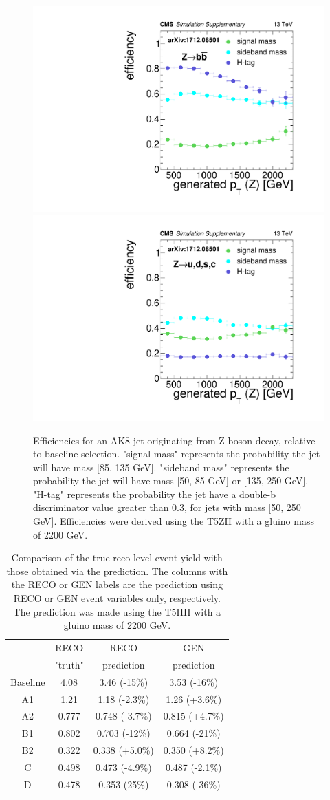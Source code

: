 \begin{figure}[hbp!]
\centering
\includegraphics[width=0.425\linewidth]{figs/CMS-SUS-17-006_Figure-aux_011.pdf}
\includegraphics[width=0.425\linewidth]{figs/CMS-SUS-17-006_Figure-aux_012.pdf}
\caption[Efficiencies for an AK8 jet originating from Z boson decay, relative to baseline selection.]{
Efficiencies for an AK8 jet originating from Z boson decay, relative to baseline selection.
"signal mass" represents the probability the jet will have mass  [85, 135 GeV].
"sideband mass" represents the probability the jet will have mass [50, 85 GeV] or [135, 250 GeV].
"H-tag" represents the probability the jet have a double-b discriminator value greater than 0.3, for jets with mass [50, 250 GeV].
Efficiencies were derived using the T5ZH  with a gluino mass of 2200 GeV.
}
\label{fig:effZ}
\end{figure}

\begin{table}[hbp!]
\centering
\caption[Comparison of the true reco-level event yield with those obtained via the prediction.]{
Comparison of the true reco-level event yield with those obtained via the prediction. The columns with the RECO or GEN labels are the prediction using RECO or GEN event variables only, respectively. The prediction was made using the T5HH  with a gluino mass of 2200 GeV.
}
\begin{tabular}{c | c c c}
\hline\hline
         & RECO     & RECO           & GEN\\
         & "truth"  & prediction     & prediction\\
\hline
Baseline & 4.08     & 3.46 (-15\%)   & 3.53 (-16\%)\\
A1       & 1.21     & 1.18 (-2.3\%)  & 1.26 (+3.6\%)\\
A2       & 0.777    & 0.748 (-3.7\%) & 0.815 (+4.7\%)\\
B1       & 0.802    & 0.703 (-12\%)  & 0.664 (-21\%)\\
B2       & 0.322    & 0.338 (+5.0\%) & 0.350 (+8.2\%)\\
C        & 0.498    & 0.473 (-4.9\%) & 0.487 (-2.1\%)\\
D        & 0.478    & 0.353 (25\%)   & 0.308 (-36\%)\\
\hline\hline
\end{tabular}
\label{tab:predclos}
\end{table}


